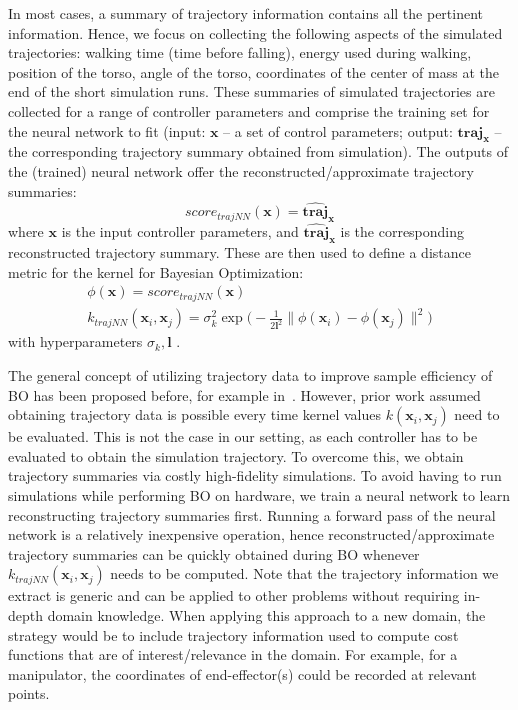 In most cases, a summary of trajectory information contains all the pertinent information. Hence, we focus on collecting the following aspects of the simulated trajectories: walking time (time before falling), energy used during walking, position of the torso, angle of the torso, coordinates of the center of mass at the end of the short simulation runs. These summaries of simulated trajectories are collected for a range of controller parameters and comprise the training set for the neural network to fit (input: $\pmb{x}$ -- a set of control parameters; output: $\pmb{traj_x}$ -- the corresponding trajectory summary obtained from simulation). The outputs of the (trained) neural network offer the reconstructed/approximate trajectory summaries:
\begin{equation}
    score_{\textit{trajNN}}(\pmb{x}) = \pmb{\widehat{traj}_x}
\end{equation}
where $\pmb{x}$ is the input controller parameters, and $\pmb{\widehat{traj}_x}$ is the corresponding reconstructed trajectory summary.
These are then used to define a distance metric for the kernel for Bayesian Optimization:
\begin{align}
\phi(\pmb{x}) = score_{trajNN}(\pmb{x})\\
k_{\textit{trajNN}}(\pmb{x}_i, \pmb{x}_j) = \sigma_k^2 \exp\Big(- \frac{1}{2 \pmb{l}^2} \|\phi(\pmb{x}_i) - \phi(\pmb{x}_j)\|^2 \Big)
\end{align}
with hyperparameters $\sigma_k, \pmb{l}$ .

The general concept of utilizing trajectory data to improve sample efficiency of BO has been proposed before, for example in~\cite{wilson2014using}. However, prior work assumed obtaining trajectory data is possible every time kernel values $k(\pmb{x}_i, \pmb{x}_j)$ need to be evaluated. This is not the case in our setting, as each controller has to be evaluated to obtain the simulation trajectory. To overcome this, we obtain trajectory summaries via costly high-fidelity simulations. To avoid having to run simulations while performing BO on hardware, we train a neural network to learn reconstructing trajectory summaries first. Running a forward pass of the neural network is a relatively inexpensive operation, hence reconstructed/approximate trajectory summaries can be quickly obtained during BO whenever $k_{\textit{trajNN}}(\pmb{x}_i, \pmb{x}_j)$ needs to be computed. Note that the trajectory information we extract is generic and can be applied to other problems without requiring in-depth domain knowledge. When applying this approach to a new domain, the strategy would be to include trajectory information used to compute cost functions that are of interest/relevance in the domain. For example, for a manipulator, the coordinates of  end-effector(s) could be recorded at relevant points.

